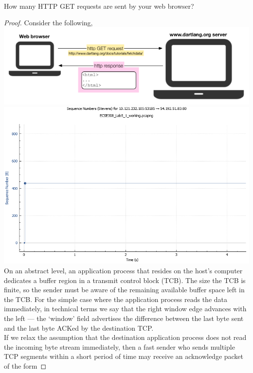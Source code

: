 \documentclass[../../main.tex]{subfiles}
\begin{document}
\begin{wts}
How many HTTP GET requests are sent by your web browser? 
\end{wts}
\begin{proof}
Consider the following,\\
\includegraphics[width=\textwidth]{subfiles/images/L5_Manual/L5N2_ DNS & HTTP_PAGE21_12_Image137.png}
\includegraphics[width=\textwidth]{subfiles/images/ECSE_308_Lab_5_1_SUPA_PAGE5_18_Image53.png}
On an abstract level, an application process that resides on the host’s computer dedicates a buffer region in a transmit control block (TCB). The size the TCB is finite, so the sender must be aware of the remaining available buffer space left in the TCB. For the simple case where the application process reads the data immediately, in technical terms we say that the right window edge advances with the left — the ‘window’ field advertises the difference between the last byte sent and the last byte ACKed by the destination TCP.\\

    If we relax the assumption that the destination application process does not read the incoming byte stream immediately, then a fast sender who sends multiple TCP segments within a short period of time may receive an acknowledge packet of the form
    

\end{proof}
\end{document}
